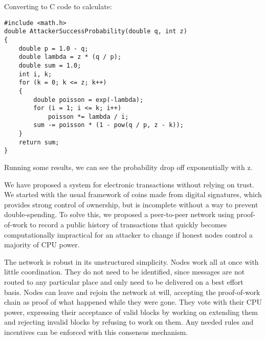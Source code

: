 \documentclass{article}
\begin{document}
Converting to C code to calculate:

\begin{verbatim}
#include <math.h>
double AttackerSuccessProbability(double q, int z)
{
    double p = 1.0 - q;
    double lambda = z * (q / p);
    double sum = 1.0;
    int i, k;
    for (k = 0; k <= z; k++)
    {
        double poisson = exp(-lambda);
        for (i = 1; i <= k; i++)
            poisson *= lambda / i;
        sum -= poisson * (1 - pow(q / p, z - k));
    }
    return sum;
}
\end{verbatim}

Running some results, we can see the probability drop off exponentially with z.

We have proposed a system for electronic transactions without relying on trust. We started with the usual framework of coins made from digital signatures, which provides strong control of ownership, but is incomplete without a way to prevent double-spending. To solve this, we proposed a peer-to-peer network using proof-of-work to record a public history of transactions that quickly becomes computationally impractical for an attacker to change if honest nodes control a majority of CPU power.

The network is robust in its unstructured simplicity. Nodes work all at once with little coordination. They do not need to be identified, since messages are not routed to any particular place and only need to be delivered on a best effort basis. Nodes can leave and rejoin the network at will, accepting the proof-of-work chain as proof of what happened while they were gone. They vote with their CPU power, expressing their acceptance of valid blocks by working on extending them and rejecting invalid blocks by refusing to work on them. Any needed rules and incentives can be enforced with this consensus mechanism.
\end{document}
